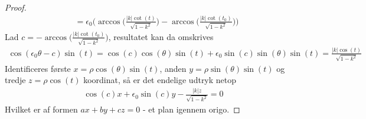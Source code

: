 \begin{proof}
\begin{align*}
&=
\epsilon_0 \Big(\arccos\big(\frac{|k|\cot(t)}{\sqrt{1-k^2}}\big) - \arccos\big(\frac{|k|\cot(t_0)}{\sqrt{1-k^2}}\big)\Big)
\end{align*}
Lad $c=- \arccos\big(\frac{|k|\cot(t_0)}{\sqrt{1-k^2}}\big)$, resultatet kan da omskrives  
\begin{align*}
\cos (\epsilon_0\theta - c)\sin(t) = \cos (c)\cos(\theta)\sin(t)+\epsilon_0 \sin(c)\sin(\theta) \sin(t) =
\frac{|k|\cos(t)}{\sqrt{1-k^2}} 
\end{align*}
Identificeres første $x=\rho\cos(\theta)\sin(t)$, anden $y=\rho\sin(\theta)\sin(t)$ og tredje $z=\rho\cos(t)$ koordinat, så er det endelige udtryk netop 
\begin{align*}
\cos (c)x+\epsilon_0\sin(c)y - \frac{|k|z}{\sqrt{1-k^2}}=0 
\end{align*}
Hvilket er af formen $ax+by+cz=0$ - et plan igennem origo.
\end{proof}